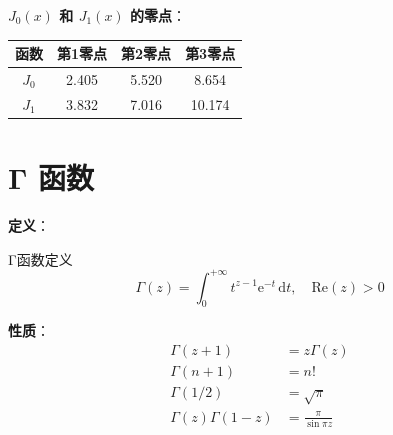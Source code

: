 \textbf{$J_0(x)$ 和 $J_1(x)$ 的零点}：
\begin{table}[htbp]
\centering
\begin{tabular}{cccc}
\toprule
函数 & 第1零点 & 第2零点 & 第3零点 \\
\midrule
$J_0$ & 2.405 & 5.520 & 8.654 \\
$J_1$ & 3.832 & 7.016 & 10.174 \\
\bottomrule
\end{tabular}
\end{table}

\section{Γ 函数}

\textbf{定义}：
\begin{dingliyi}{Γ函数定义}{}
\[
    \Gamma(z) = \int_0^{+\infty} t^{z-1}\mathrm{e}^{-t}\,\mathrm{d}t, \quad \mathrm{Re}(z) > 0
\]
\end{dingliyi}

\textbf{性质}：
\begin{align}
    \Gamma(z+1) &= z\Gamma(z) \\
    \Gamma(n+1) &= n! \\
    \Gamma(1/2) &= \sqrt{\pi} \\
    \Gamma(z)\Gamma(1-z) &= \frac{\pi}{\sin\pi z}
\end{align}
